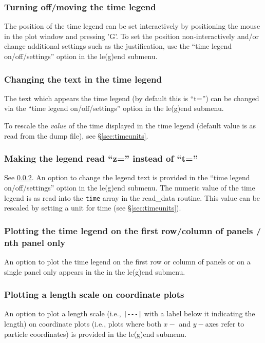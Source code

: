 \documentclass[a4paper,10pt]{article}
\begin{document}
\subsubsection{ Turning off/moving the time legend}
\label{sec:legendoff}
 The position of the time legend can be set interactively by positioning the mouse in the plot window and pressing 'G'. To set the position non-interactively and/or change additional settings such as the justification, use the ``time legend on/off/settings'' option in the le(g)end submenu.

\subsubsection{ Changing the text in the time legend}
\label{sec:timelegendtext}
 The text which appears the time legend (by default this is ``t='') can be changed via the  ``time legend on/off/settings'' option in the le(g)end submenu.

 To rescale the \emph{value} of the time displayed in the time legend (default value is as read from the dump file), see \S\ref{sec:timeunits}.
 
\subsubsection{ Making the legend read ``z='' instead of ``t=''}
 See \ref{sec:timelegendtext}. An option to change the legend text is provided in the  ``time legend on/off/settings'' option in the le(g)end submenu. The numeric value of the time legend is as read into the \verb+time+ array in the read\_data routine. This value can be rescaled by setting a unit for time (see \S\ref{sec:timeunits}). 
  
\subsubsection{ Plotting the time legend on the first row/column of panels / nth panel only}
 An option to plot the time legend on the first row or column of panels or on a single panel only appears in the in the le(g)end submenu.

\subsubsection{ Plotting a length scale on coordinate plots}
 An option to plot a length scale (i.e., \verb+|---|+ with a label below it indicating the length) on coordinate plots (i.e., plots where both $x-$ and $y-$axes refer to particle coordinates) is provided in the le(g)end submenu.
\end{document}
